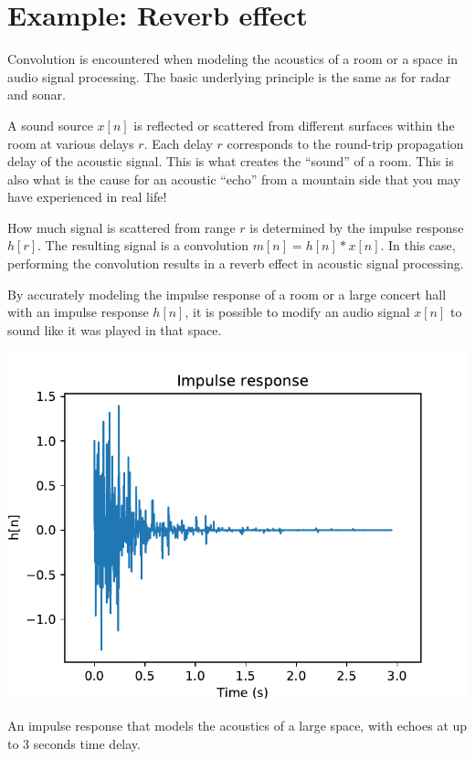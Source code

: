 \section{Example: Reverb effect}
\label{reverb_section}

Convolution is encountered when modeling the acoustics of a room or a
space in audio signal processing. The basic underlying principle is
the same as for radar and sonar.

A sound source $x[n]$ is reflected or scattered from different
surfaces within the room at various delays $r$. Each delay $r$
corresponds to the round-trip propagation delay of the acoustic
signal. This is what creates the ``sound'' of a room. This is also
what is the cause for an acoustic ``echo'' from a mountain side that
you may have experienced in real life!

How much signal is scattered from range $r$ is determined by the impulse
response $h[r]$. The resulting signal is a convolution $m[n] = h[n]*
x[n]$. In this case, performing the convolution results in a reverb
effect in acoustic signal processing. 

By accurately modeling the impulse response of a room or a large
concert hall with an impulse response $h[n]$, it is possible to modify
an audio signal $x[n]$ to sound like it was played in that space.

\begin{marginfigure}
\begin{center}
\includegraphics[width=\textwidth]{Applications/figures/reverb.pdf}
\end{center}
\caption{An impulse response that models the acoustics of a large space, with echoes at up to 3 seconds time delay.}
\label{fig:room_model}
\end{marginfigure}


